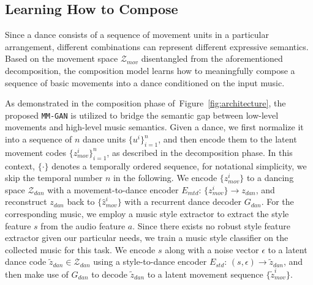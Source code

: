 \documentclass{article}
\newlength\secmargin
\newlength\subsecmargin
\newcommand{\figref}[1]{Figure~\ref{fig:#1}}
\begin{document}
\subsection{Learning How to Compose}
\label{subsec:stage2}
\vspace{\subsecmargin}
Since a dance consists of a sequence of movement units in a particular arrangement, different combinations can represent different expressive semantics. 
Based on the movement space $\mathcal{Z}_{mov}$ disentangled from the aforementioned decomposition, the composition model learns how to meaningfully compose a sequence of basic movements into a dance conditioned on the input music.

As demonstrated in the composition phase of~\figref{architecture}, the proposed \texttt{MM-GAN} is utilized to bridge the semantic gap between low-level movements and high-level music semantics. 
Given a dance, we first normalize it into a sequence of $n$ dance units $\{u^i\}^n_{i=1}$, and then encode them to the latent movement codes $\{z_{mov}^i\}^n_{i=1}$, as described in the decomposition phase. 
In this context, $\{\cdot\}$ denotes a temporally ordered sequence, for notational simplicity, we skip the temporal number $n$ in the following. 
We encode $\{z_{mov}^i\}$ to a dancing space $\mathcal{Z}_{dan}$ with a movement-to-dance encoder $E_{mtd}$: $\{z_{mov}^i\} \rightarrow z_{dan}$, and reconstruct $z_{dan}$ back to $\{\hat{z}_{mov}^i\}$ with a recurrent dance decoder $G_{dan}$.
For the corresponding music, we employ a music style extractor to extract the style feature $s$ from the audio feature $a$.
Since there exists no robust style feature extractor given our particular needs, we train a music style classifier on the collected music for this task.
We encode $s$ along with a noise vector $\epsilon$ to a latent dance code $\tilde{z}_{dan} \in \mathcal{Z}_{dan}$ using a style-to-dance encoder $E_{std}$: $(s, \epsilon) \rightarrow \tilde{z}_{dan}$, and then make use of $G_{dan}$ to decode $\tilde{z}_{dan}$ to a latent movement sequence $\{\tilde{z}_{mov}^i\}$. 
\end{document}
